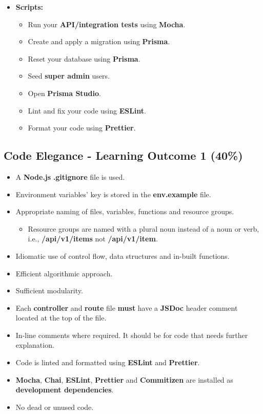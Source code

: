 \documentclass{article}
\begin{document}
\begin{itemize}
	\item \textbf{Scripts:}
	\begin{itemize}
		\item Run your \textbf{API/integration tests} using \textbf{Mocha}.
		\item Create and apply a migration using \textbf{Prisma}.
		\item Reset your database using \textbf{Prisma}.
		\item Seed \textbf{super admin} users.
		\item Open \textbf{Prisma Studio}. 
		\item Lint and fix your code using \textbf{ESLint}.
		\item Format your code using \textbf{Prettier}.
	\end{itemize}
\end{itemize} 

\subsection*{Code Elegance - Learning Outcome 1 (40\%)}
\begin{itemize}
	\item A \textbf{Node.js} \textbf{.gitignore} file is used.
	\item Environment variables' key is stored in the \textbf{env.example} file. 
	\item Appropriate naming of files, variables, functions and resource groups.
	\begin{itemize}
	  \item Resource groups are named with a plural noun instead of a noun or verb, i.e., \textbf{/api/v1/items} not \textbf{/api/v1/item}.
	\end{itemize}
	\item Idiomatic use of control flow, data structures and in-built functions.
	  \item Efficient algorithmic approach.
  \item Sufficient modularity.
  \item Each \textbf{controller} and \textbf{route} file \textbf{must} have a \textbf{JSDoc} header comment located at the top of the file.
\item In-line comments where required. It should be for code that needs further explanation.
	\item Code is linted and formatted using \textbf{ESLint} and \textbf{Prettier}.
	\item \textbf{Mocha}, \textbf{Chai}, \textbf{ESLint}, \textbf{Prettier} and \textbf{Commitizen} are installed as \textbf{development dependencies}.	
	\item No dead or unused code.
\end{itemize}
\end{document}
